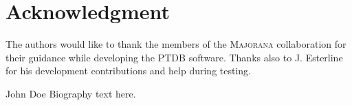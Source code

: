 \documentclass[journal]{IEEEtran}
\begin{document}
\section*{Acknowledgment}
The authors would like to thank the members of the \textsc{Majorana} collaboration
for their guidance while developing the PTDB software. Thanks also
to J. Esterline for his development contributions and help during testing.


\ifCLASSOPTIONcaptionsoff
  \newpage
\fi








% 

\begin{IEEEbiographynophoto}{John Doe}
Biography text here.
\end{IEEEbiographynophoto}






\end{document}
